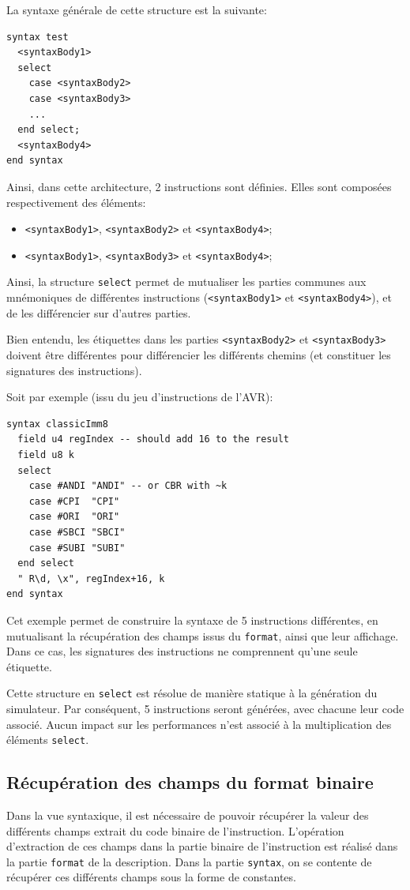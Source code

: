 La syntaxe générale de cette structure est la suivante:
\begin{lstlisting}
syntax test
  <syntaxBody1>
  select 
    case <syntaxBody2>
    case <syntaxBody3>
    ...
  end select;
  <syntaxBody4>
end syntax
\end{lstlisting}
Ainsi, dans cette architecture, 2 instructions sont définies. Elles sont composées respectivement des éléments:
\begin{itemize}
\item \texttt{<syntaxBody1>}, \texttt{<syntaxBody2>} et \texttt{<syntaxBody4>};
\item \texttt{<syntaxBody1>}, \texttt{<syntaxBody3>} et \texttt{<syntaxBody4>};
\end{itemize}
 Ainsi, la structure \texttt{select} permet de mutualiser les parties communes aux mnémoniques de différentes instructions (\texttt{<syntaxBody1>} et \texttt{<syntaxBody4>}), et de les différencier sur d'autres parties.

Bien entendu, les étiquettes dans les parties \texttt{<syntaxBody2>} et  \texttt{<syntaxBody3>} doivent être différentes pour différencier les différents chemins (et constituer les signatures des instructions).

Soit par exemple (issu du jeu d'instructions de l'AVR):
\begin{lstlisting}
syntax classicImm8 
  field u4 regIndex -- should add 16 to the result
  field u8 k
  select
    case #ANDI "ANDI" -- or CBR with ~k 
    case #CPI  "CPI"
    case #ORI  "ORI"
    case #SBCI "SBCI"
    case #SUBI "SUBI"
  end select
  " R\d, \x", regIndex+16, k
end syntax
\end{lstlisting}
Cet exemple permet de construire la syntaxe de 5 instructions différentes, en mutualisant la récupération des champs issus du \texttt{format}, ainsi que leur affichage. Dans ce cas, les signatures des instructions ne comprennent qu'une seule étiquette.

Cette structure en \texttt{select} est résolue de manière statique à la génération du simulateur. Par conséquent, 5 instructions seront générées, avec chacune leur code associé. Aucun impact sur les performances n'est associé à la multiplication des éléments \texttt{select}.

\subsection{Récupération des champs du format binaire}
 \label{sec:syntaxField}
 Dans la vue syntaxique, il est nécessaire de pouvoir récupérer la valeur des différents champs extrait du code binaire de l'instruction. L'opération d'extraction de ces champs dans la partie binaire de l'instruction est réalisé dans la partie \texttt{format} de la description. Dans la partie \texttt{syntax}, on se contente de récupérer ces différents champs sous la forme de constantes.
 
